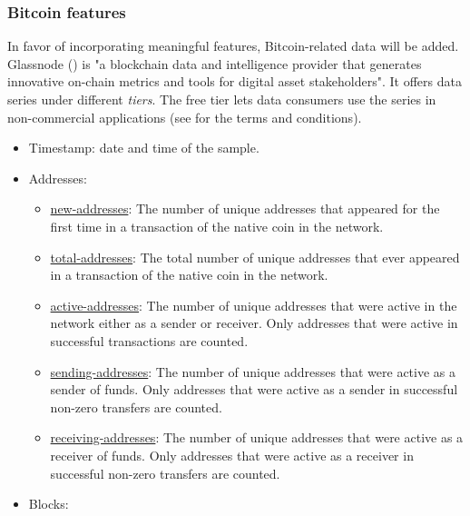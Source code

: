 \subsubsection{Bitcoin features}
\label{sec:material_data_bitcoin_features}

In favor of incorporating meaningful features, Bitcoin-related data will be added. Glassnode (\cite{glassnode}) is "a blockchain data and intelligence provider that generates innovative on-chain metrics and tools for digital asset stakeholders". It offers data series under different \emph{tiers}. The free tier lets data consumers use the series in non-commercial applications (see \cite{glassnode_terms} for the terms and conditions).

\begin{itemize}
    \item Timestamp: date and time of the sample.
    \item Addresses:
    \begin{itemize}
        \item \href{https://studio.glassnode.com/metrics?a=BTC&m=addresses.NewNonZeroCount}{new-addresses}: The number of unique addresses that appeared for the first time in a transaction of the native coin in the network.
        \item \href{https://studio.glassnode.com/metrics?a=BTC&m=addresses.Count}{total-addresses}: The total number of unique addresses that ever appeared in a transaction of the native coin in the network.
        \item \href{https://studio.glassnode.com/metrics?a=BTC&m=addresses.ActiveCount}{active-addresses}: The number of unique addresses that were active in the network either as a sender or receiver. Only addresses that were active in successful transactions are counted.
        \item \href{https://studio.glassnode.com/metrics?a=BTC&m=addresses.SendingCount}{sending-addresses}: The number of unique addresses that were active as a sender of funds. Only addresses that were active as a sender in successful non-zero transfers are counted.
        \item \href{https://studio.glassnode.com/metrics?a=BTC&m=addresses.ReceivingCount}{receiving-addresses}: The number of unique addresses that were active as a receiver of funds. Only addresses that were active as a receiver in successful non-zero transfers are counted.
    \end{itemize}
    \item Blocks:
    \begin{itemize}

\end{itemize}
\end{itemize}
